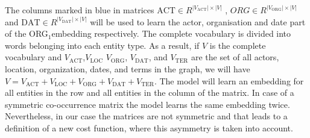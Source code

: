 The columns marked in blue in matrices $\mathrm{ACT}\in R^{|V_{\mathrm{ACT}}|\times |V|}$ , $ORG\in R^{|V_{\mathrm{ORG}}|\times |V|}$  and $\mathrm{DAT}\in R^{|V_{\mathrm{DAT}}|\times |V|}$ will be used to learn the actor, organisation and date part of the ORG$_1$embedding respectively. The complete vocabulary is divided into words belonging into each entity type. As a result, if $V$ is the complete vocabulary and $V_{\mathrm{ACT}}$,$V_{\mathrm{LOC}}$ $V_{\mathrm{ORG}}$, $V_{\mathrm{DAT}}$, and $V_{\mathrm{TER}}$ are the set of all actors, location, organization, dates, and terms in the graph, we will have $V=V_{\mathrm{ACT}}+V_{\mathrm{LOC}}+V_{\mathrm{ORG}}+V_{\mathrm{DAT}}+V_{\mathrm{TER}}$. The model will learn an embedding for all entities in the row and all entities in the column of the matrix. In case of a symmetric co-occurrence matrix the model learns the same embedding twice. Nevertheless, in our case the matrices are not symmetric and that leads to a definition of a new cost function, where this asymmetry is taken into account.
